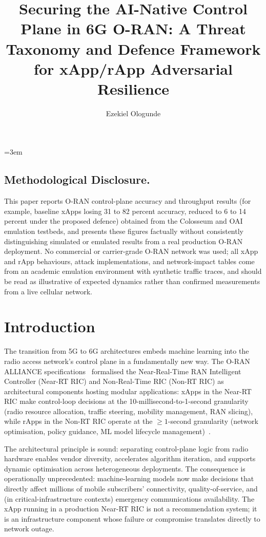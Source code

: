 \documentclass[sigconf,nonacm]{acmart}
\title{Securing the AI-Native Control Plane in 6G O-RAN: A Threat Taxonomy and Defence Framework for xApp/rApp Adversarial Resilience}
\author{Ezekiel Ologunde}
\affiliation{%
  \institution{Independent Researcher}
  \city{Boston}
  \state{MA}
  \country{USA}}
\begin{document}
\maketitle
\sloppy
{}
\emergencystretch=3em
\hfuzz=10pt

\subsection*{Methodological Disclosure.}
This paper reports O-RAN control-plane accuracy and throughput results (for example, baseline xApps losing 31 to 82 percent accuracy, reduced to 6 to 14 percent under the proposed defence) obtained from the Colosseum and OAI emulation testbeds, and presents these figures factually without consistently distinguishing simulated or emulated results from a real production O-RAN deployment. No commercial or carrier-grade O-RAN network was used; all xApp and rApp behaviours, attack implementations, and network-impact tables come from an academic emulation environment with synthetic traffic traces, and should be read as illustrative of expected dynamics rather than confirmed measurements from a live cellular network.

\section{Introduction}

The transition from 5G to 6G architectures embeds machine learning
into the radio access network's control plane in a fundamentally
new way. The O-RAN ALLIANCE specifications~\cite{oran2024spec}
formalised the Near-Real-Time RAN Intelligent Controller (Near-RT
RIC) and Non-Real-Time RIC (Non-RT RIC) as architectural components
hosting modular applications: xApps in the Near-RT RIC make
control-loop decisions at the 10-millisecond-to-1-second granularity
(radio resource allocation, traffic steering, mobility management,
RAN slicing), while rApps in the Non-RT RIC operate at the
$\geq 1$-second granularity (network optimisation, policy
guidance, ML model lifecycle
management)~\cite{polese2023understanding,bonati2024oran}.

The architectural principle is sound: separating control-plane
logic from radio hardware enables vendor diversity, accelerates
algorithm iteration, and supports dynamic optimisation across
heterogeneous deployments. The consequence is operationally
unprecedented: machine-learning models now make decisions
that directly affect millions of mobile subscribers' connectivity,
quality-of-service, and (in critical-infrastructure contexts)
emergency communications availability. The xApp running in a
production Near-RT RIC is not a recommendation system; it is an
infrastructure component whose failure or compromise translates
directly to network outage.
\end{document}
